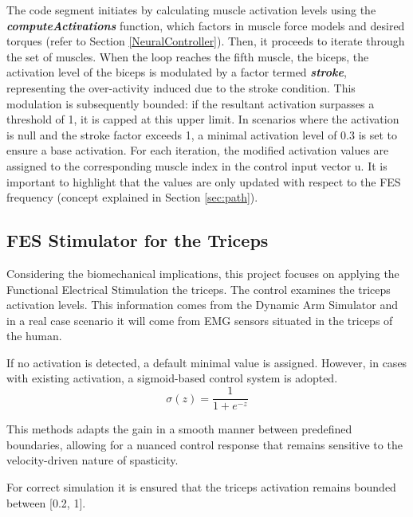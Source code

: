 The code segment initiates by calculating muscle activation levels using the \textbf{\textit{computeActivations}} function, which factors in muscle force models and desired torques  (refer to Section \ref{NeuralController}). Then, it proceeds to iterate through the set of  muscles. When the loop reaches the fifth muscle, the biceps, the activation level of the biceps is modulated by a factor termed \textbf{\textit{stroke}}, representing the over-activity induced due to the stroke condition. This modulation is subsequently bounded: if the resultant activation surpasses a threshold of 1, it is capped at this upper limit. In scenarios where the activation is null and the stroke factor exceeds 1, a minimal activation level of 0.3 is set to ensure a base activation. For each iteration, the modified activation values are assigned to the corresponding muscle index in the control input vector u. It is important to highlight that the values are only updated with respect to the FES frequency (concept explained in Section \ref{sec:path}).

\subsection{FES Stimulator for the Triceps}

Considering the biomechanical implications, this project focuses on applying the Functional Electrical Stimulation the triceps. The control examines the triceps activation levels. This information comes from the Dynamic Arm Simulator and in a real case scenario it will come from EMG sensors situated in the triceps of the human. 

If no activation is detected, a default minimal value is assigned. However, in cases with existing activation, a sigmoid-based control system is adopted. 
\begin{equation}
    \sigma(z) = \frac{1}{1 + e^{-z}}
\end{equation}

This methods adapts the gain in a smooth manner between predefined boundaries, allowing for a nuanced control response that remains sensitive to the velocity-driven nature of spasticity.

For correct simulation it is ensured that the triceps activation remains bounded between [0.2, 1]. 



